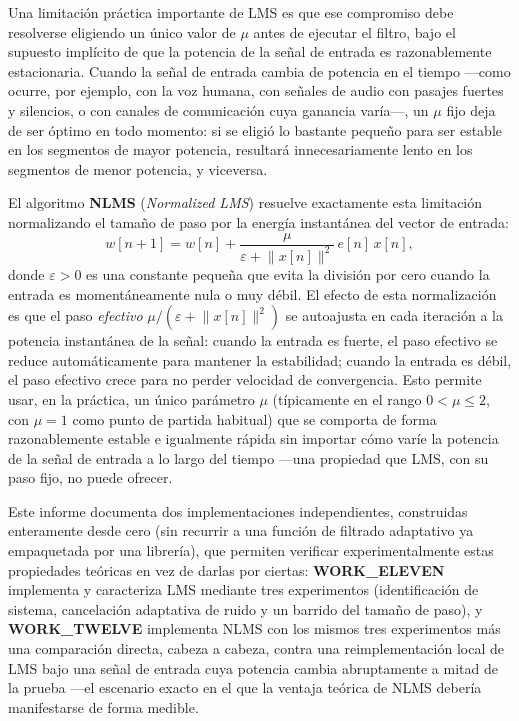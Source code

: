 Una limitación práctica importante de LMS es que ese compromiso debe
resolverse eligiendo un único valor de $\mu$ antes de ejecutar el
filtro, bajo el supuesto implícito de que la potencia de la señal de
entrada es razonablemente estacionaria. Cuando la señal de entrada
cambia de potencia en el tiempo —como ocurre, por ejemplo, con la voz
humana, con señales de audio con pasajes fuertes y silencios, o con
canales de comunicación cuya ganancia varía—, un $\mu$ fijo deja de ser
óptimo en todo momento: si se eligió lo bastante pequeño para ser
estable en los segmentos de mayor potencia, resultará innecesariamente
lento en los segmentos de menor potencia, y viceversa.

El algoritmo \textbf{NLMS} (\textit{Normalized LMS}) resuelve
exactamente esta limitación normalizando el tamaño de paso por la
energía instantánea del vector de entrada:
\begin{equation}
w[n+1] = w[n] + \frac{\mu}{\varepsilon + \lVert x[n] \rVert^2} \, e[n] \, x[n],
\label{eq:nlms}
\end{equation}
donde $\varepsilon > 0$ es una constante pequeña que evita la división
por cero cuando la entrada es momentáneamente nula o muy débil. El
efecto de esta normalización es que el paso \emph{efectivo}
$\mu / (\varepsilon + \lVert x[n] \rVert^2)$ se autoajusta en cada
iteración a la potencia instantánea de la señal: cuando la entrada es
fuerte, el paso efectivo se reduce automáticamente para mantener la
estabilidad; cuando la entrada es débil, el paso efectivo crece para
no perder velocidad de convergencia. Esto permite usar, en la práctica,
un único parámetro $\mu$ (típicamente en el rango $0 < \mu \leq 2$,
con $\mu = 1$ como punto de partida habitual) que se comporta de forma
razonablemente estable e igualmente rápida sin importar cómo varíe la
potencia de la señal de entrada a lo largo del tiempo —una propiedad
que LMS, con su paso fijo, no puede ofrecer.

Este informe documenta dos implementaciones independientes, construidas
enteramente desde cero (sin recurrir a una función de filtrado
adaptativo ya empaquetada por una librería), que permiten verificar
experimentalmente estas propiedades teóricas en vez de darlas por
ciertas: \textbf{WORK\_ELEVEN} implementa y caracteriza LMS mediante
tres experimentos (identificación de sistema, cancelación adaptativa de
ruido y un barrido del tamaño de paso), y \textbf{WORK\_TWELVE}
implementa NLMS con los mismos tres experimentos más una comparación
directa, cabeza a cabeza, contra una reimplementación local de LMS bajo
una señal de entrada cuya potencia cambia abruptamente a mitad de la
prueba —el escenario exacto en el que la ventaja teórica de NLMS debería
manifestarse de forma medible.
